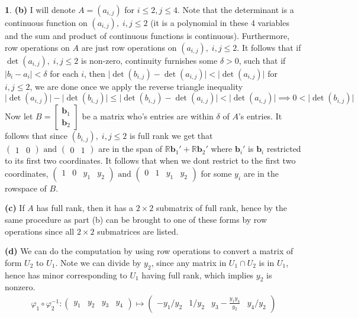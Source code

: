 \documentclass[10.5pt]{article}
\theoremstyle{definition}
\newtheorem{pb}{}
\newcommand{\abs}[1]{\lvert#1\rvert}
\newcommand{\tand}{\text{ and }}
\begin{document}
\begin{pb}
    \textbf{(b)} 
    I will denote \(A = (a_{i,j})\) for \(i \leq 2, j \leq 4\). Note that the determinant is a continuous function on \((a_{i,j}), \; i,j \leq 2\) 
    (it is a polynomial in these 4 variables and the sum and product of continuous functions is continuous).
    Furthermore, row operations on \(A\) are just row operations on \((a_{i,j}), \; i,j \leq 2\). It follows that if \(\det (a_{i,j}), \; i,j \leq 2\) is non-zero, continuity furnishes some \(\delta > 0\), such that
    if \(\abs{b_i - a_i} < \delta\) for each \(i\), then \(\abs{\det (b_{i,j}) - \det (a_{i,j})} < \abs{\det (a_{i,j})}\) for \(i,j \leq 2\), we are done once we apply the reverse triangle inequality
    \[\abs{\det (a_{i,j})} - \abs{\det (b_{i,j})} \leq \abs{\det (b_{i,j}) - \det (a_{i,j})} < \abs{\det (a_{i,j})} \implies 0 < \abs{\det (b_{i,j})}\]
    Now let \(B = \begin{bmatrix}
        \mathbf{b}_1 \\
        \mathbf{b}_2
    \end{bmatrix}\) be a matrix who's entries are within \(\delta\) of \(A\)'s entries. It follows that since \((b_{i,j}), \; i,j \leq 2\) is full rank
    we get that \(\begin{pmatrix}
        1 & 0
    \end{pmatrix} \tand \begin{pmatrix}
        0 & 1
    \end{pmatrix}\) are in the span of \(\mathbb{R} \mathbf{b}_1' + \mathbb{R} \mathbf{b}_2'\) where \(\mathbf{b}_i'\) is \(\mathbf{b}_i\) restricted to its first two coordinates.
    It follows that when we dont restrict to the first two coordinates,
    \(\begin{pmatrix}
        1 & 0 &y_1&y_2
    \end{pmatrix} \tand \begin{pmatrix}
        0 & 1 &y_1&y_2
    \end{pmatrix}\) for some \(y_i\) are in the rowspace of \(B\).

    \textbf{(c)} If \(A\) has full rank, then it has a \(2 \times 2\) submatrix of full rank, hence by the same procedure as part (b) can be brought
    to one of these forms by row operations since all \(2 \times 2\) submatrices are listed.

    \textbf{(d)} We can do the computation by using row operations to convert a matrix of form \(U_2\) to \(U_1\). Note we can divide by \(y_2\), since any matrix in
    \(U_1 \cap U_2\) is in \(U_1\), hence has minor corresponding to \(U_1\) having full rank, which implies \(y_2\) is nonzero.
    \begin{align*}
        \varphi_1 \circ \varphi_2^{-1}:
            \begin{pmatrix}
                y_1 & y_2 & y_3 & y_4
            \end{pmatrix}
            \mapsto \begin{pmatrix}
                -y_1/y_2 & 1/y_2 & y_3 - \frac{y_1y_4}{y_2} & y_4/y_2
            \end{pmatrix}
    \end{align*}
\end{pb}
\end{document}
